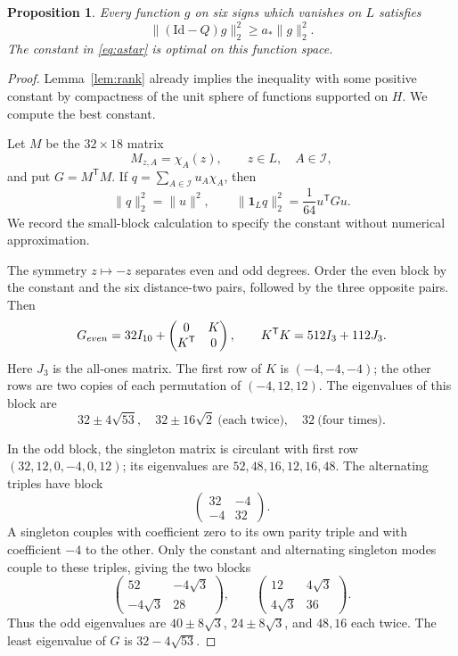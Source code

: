 \documentclass[10pt,a4paper]{amsart}
\newtheorem{proposition}{Proposition}
\newcommand{\Id}{\mathrm{Id}}
\newcommand{\astar}{a_*}
\newcommand{\cI}{\mathcal I}
\newcommand{\one}{\mathbf 1}
\begin{document}
\begin{proposition}\label{prop:coercivity}
Every function $g$ on six signs which vanishes on $L$ satisfies
\begin{equation}\label{eq:coercivity}
 \|(\Id-Q)g\|_2^2\ge\astar\|g\|_2^2.
\end{equation}
The constant in \eqref{eq:astar} is optimal on this function space.
\end{proposition}

\begin{proof}
Lemma~\ref{lem:rank} already implies the inequality with some positive constant by compactness of the unit sphere of functions supported on $H$. We compute the best constant.

Let $M$ be the $32\times18$ matrix
\[
 M_{z,A}=\chi_A(z),\qquad z\in L,\quad A\in\cI,
\]
and put $G=M^{\mathsf T}M$. If $q=\sum_{A\in\cI}u_A\chi_A$, then
\begin{equation}\label{eq:gramnorm}
 \|q\|_2^2=\|u\|^2,\qquad
 \|\one_Lq\|_2^2=\frac1{64}u^{\mathsf T}Gu.
\end{equation}
We record the small-block calculation to specify the constant without numerical approximation.

The symmetry $z\mapsto-z$ separates even and odd degrees. Order the even block by the constant and the six distance-two pairs, followed by the three opposite pairs. Then
\[
 G_{\rm even}=32I_{10}+
 \begin{pmatrix}0&K\\K^{\mathsf T}&0\end{pmatrix},
 \qquad K^{\mathsf T}K=512I_3+112J_3.
\]
Here $J_3$ is the all-ones matrix. The first row of $K$ is $(-4,-4,-4)$; the other rows are two copies of each permutation of $(-4,12,12)$. The eigenvalues of this block are
\[
 32\pm4\sqrt{53},\quad
 32\pm16\sqrt2\ \text{(each twice)},\quad
 32\ \text{(four times)}.
\]

In the odd block, the singleton matrix is circulant with first row $(32,12,0,-4,0,12)$; its eigenvalues are $52,48,16,12,16,48$. The alternating triples have block
\[
 \begin{pmatrix}32&-4\\-4&32\end{pmatrix}.
\]
A singleton couples with coefficient zero to its own parity triple and with coefficient $-4$ to the other. Only the constant and alternating singleton modes couple to these triples, giving the two blocks
\[
 \begin{pmatrix}52&-4\sqrt3\\-4\sqrt3&28\end{pmatrix},
 \qquad
 \begin{pmatrix}12&4\sqrt3\\4\sqrt3&36\end{pmatrix}.
\]
Thus the odd eigenvalues are $40\pm8\sqrt3$, $24\pm8\sqrt3$, and $48,16$ each twice. The least eigenvalue of $G$ is $32-4\sqrt{53}$.


\end{proof}
\end{document}
